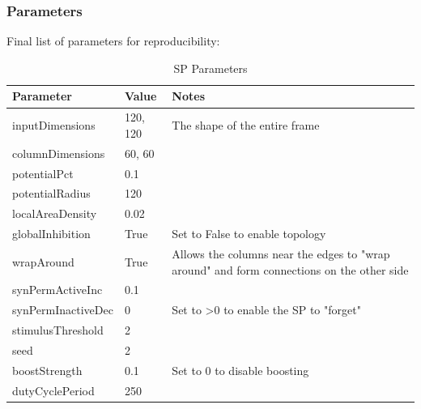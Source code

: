 \subsubsection{Parameters}
Final list of parameters for reproducibility:
\begin{table}[H]
    \centering
    \begin{tabularx}{\linewidth}{@{}llX@{}}
        \toprule
        \textbf{Parameter} & \textbf{Value} & \textbf{Notes}                                      \\
        \midrule
        inputDimensions    & 120, 120       & The shape of the entire frame                       \\
        columnDimensions   & 60, 60         &                                                     \\
        potentialPct       & 0.1            &                                                     \\
        potentialRadius    & 120            &                                                     \\
        localAreaDensity   & 0.02           &                                                     \\
        globalInhibition   & True           & Set to False to enable topology                     \\
        wrapAround         & True           &
        Allows the columns near the edges to "wrap around" and form connections on the other side \\
        synPermActiveInc   & 0.1            &                                                     \\
        synPermInactiveDec & 0              & Set to \textgreater{}0 to enable the SP to "forget" \\
        stimulusThreshold  & 2              &                                                     \\
        seed               & 2              &                                                     \\
        boostStrength      & 0.1            & Set to 0 to disable boosting                        \\
        dutyCyclePeriod    & 250            &                                                     \\
        \bottomrule
    \end{tabularx}

    \caption{SP Parameters}
    \label{tab:bb_sp_params}
\end{table}
